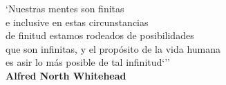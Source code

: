 \begin{flushleft}
\large
`Nuestras mentes son finitas \\
e inclusive en estas circunstancias \\
de finitud estamos rodeados de posibilidades \\
que son infinitas, y el propósito de la vida humana \\
es asir lo más posible de tal infinitud`''\\

\textbf{Alfred North Whitehead}
\end{flushleft}